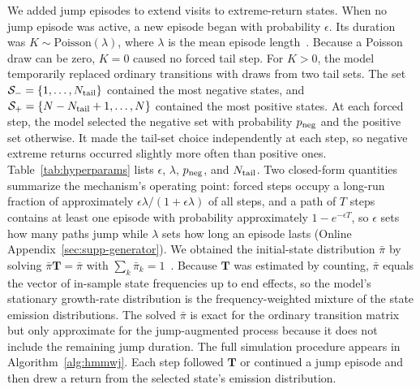 We added jump episodes to extend visits to extreme-return states. When
no jump episode was active, a new episode began with probability
$\epsilon$. Its duration was
$K\sim\mathrm{Poisson}(\lambda)$, where $\lambda$ is the mean episode
length~\cite{glasserman2003}. Because a Poisson draw can be zero,
$K=0$ caused no forced tail step. For $K>0$, the model temporarily
replaced ordinary transitions with draws from two tail sets. The set
$\mathcal{S}_{-}=\{1,\dots,N_{\rm tail}\}$ contained the most negative
states, and $\mathcal{S}_{+}=\{N-N_{\rm tail}+1,\dots,N\}$ contained the
most positive states. At each forced step, the model selected the negative
set with probability $p_{\rm neg}$ and the positive set otherwise. It
made the tail-set choice independently at each step, so negative extreme
returns occurred slightly more often than positive ones.
Table~\ref{tab:hyperparams} lists $\epsilon$, $\lambda$, $p_{\rm neg}$,
and $N_{\rm tail}$. Two closed-form quantities summarize the
mechanism's operating point: forced steps occupy a long-run fraction
of approximately $\epsilon\lambda/(1+\epsilon\lambda)$ of all steps,
and a path of $T$ steps contains at least one episode with
probability approximately $1 - e^{-\epsilon T}$, so $\epsilon$ sets
how many paths jump while $\lambda$ sets how long an episode lasts
(Online Appendix~\ref{sec:supp-generator}). We obtained the
initial-state distribution
$\bar{\pi}$ by solving
$\bar{\pi}\mathbf{T}=\bar{\pi}$ with
$\sum_k\bar{\pi}_k=1$~\cite{hamilton2018regime, grinsteadSnell1997}.
Because $\mathbf{T}$ was estimated by counting, $\bar{\pi}$ equals
the vector of in-sample state frequencies up to end effects, so the
model's stationary growth-rate distribution is the
frequency-weighted mixture of the state emission distributions. The
solved $\bar{\pi}$ is exact for the ordinary transition matrix but only
approximate for the jump-augmented process because it does not include
the remaining jump duration. The full simulation procedure appears in
Algorithm~\ref{alg:hmmwj}. Each step followed $\mathbf{T}$ or continued
a jump episode and then drew a return from the selected state's emission
distribution.


